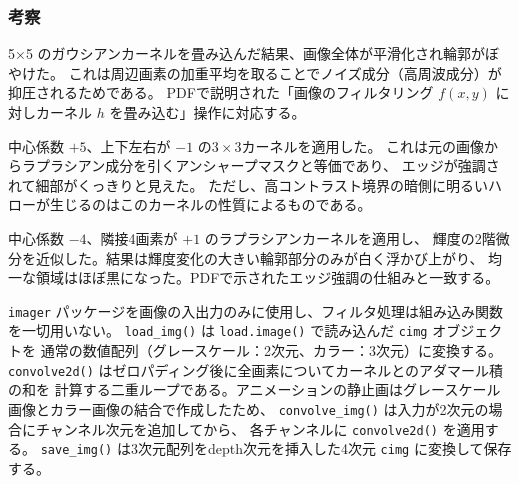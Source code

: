 \documentclass[12pt,a4paper]{ltjsarticle}
\begin{document}
  \subsubsection{考察}\label{subsubsec:task3-explanation}

  \vspace{8pt}
  \begin{description}[style=nextline, leftmargin=2em, topsep=6pt]
  \vspace{4pt}
    \item[ガウシアンフィルタ]
      5×5 のガウシアンカーネルを畳み込んだ結果、画像全体が平滑化され輪郭がぼやけた。
      これは周辺画素の加重平均を取ることでノイズ成分（高周波成分）が抑圧されるためである。
      PDFで説明された「画像のフィルタリング $f(x,y)$ に対しカーネル $h$ を畳み込む」操作に対応する。

  \vspace{4pt}
    \item[鮮鋭化フィルタ]
      中心係数 $+5$、上下左右が $-1$ の$3\times3$カーネルを適用した。
      これは元の画像からラプラシアン成分を引くアンシャープマスクと等価であり、
      エッジが強調されて細部がくっきりと見えた。
      ただし、高コントラスト境界の暗側に明るいハローが生じるのはこのカーネルの性質によるものである。

  \vspace{4pt}
    \item[ラプラシアンフィルタ（エッジ抽出）]
      中心係数 $-4$、隣接4画素が $+1$ のラプラシアンカーネルを適用し、
      輝度の2階微分を近似した。結果は輝度変化の大きい輪郭部分のみが白く浮かび上がり、
      均一な領域はほぼ黒になった。PDFで示されたエッジ強調の仕組みと一致する。

  \vspace{4pt}
    \item[実装の仕組み]
      \verb|imager| パッケージを画像の入出力のみに使用し、フィルタ処理は組み込み関数を一切用いない。
      \verb|load_img()| は \verb|load.image()| で読み込んだ \texttt{cimg} オブジェクトを
      通常の数値配列（グレースケール：2次元、カラー：3次元）に変換する。
      \verb|convolve2d()| はゼロパディング後に全画素についてカーネルとのアダマール積の和を
      計算する二重ループである。アニメーションの静止画はグレースケール画像とカラー画像の結合で作成したため、
      \verb|convolve_img()| は入力が2次元の場合にチャンネル次元を追加してから、
      各チャンネルに \verb|convolve2d()| を適用する。
      \verb|save_img()| は3次元配列をdepth次元を挿入した4次元 \texttt{cimg} に変換して保存する。
  \end{description}
\end{document}

